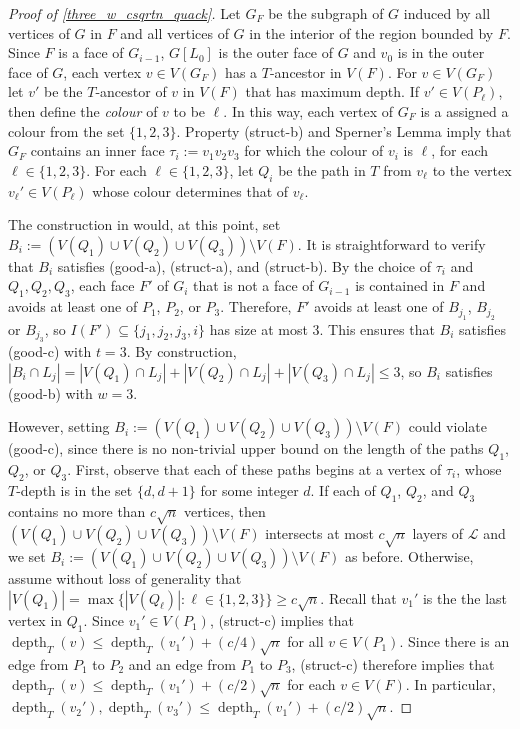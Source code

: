 \documentclass{patmorin}
\newcommand{\defin}[1]{\emph{\textcolor{brightmaroon}{#1}}}
\DeclareMathOperator{\depth}{depth}
\begin{document}
\begin{proof}[Proof of \cref{three_w_csqrtn_quack}]
  Let $G_F$ be the subgraph of $G$ induced by all vertices of $G$ in $F$ and all vertices of $G$ in the interior of the region bounded by $F$.  Since $F$ is a face of $G_{i-1}$, $G[L_0]$ is the outer face of $G$ and $v_0$ is in the outer face of $G$, each vertex $v\in V(G_F)$ has a $T$-ancestor in $V(F)$.  For $v\in V(G_F)$ let $v'$ be the $T$-ancestor of $v$ in $V(F)$ that has maximum depth.   If $v'\in V(P_\ell)$, then define the \defin{colour} of $v$ to be $\ell$.  In this way, each vertex of $G_F$ is a assigned a colour from the set $\{1,2,3\}$.  Property (struct-b) and Sperner's Lemma imply that $G_F$ contains an inner face $\tau_i:=v_1v_2v_3$ for which the colour of $v_i$ is $\ell$, for each $\ell\in\{1,2,3\}$.  For each $\ell\in\{1,2,3\}$, let $Q_i$ be the path in $T$ from $v_\ell$ to the vertex $v_{\ell}'\in V(P_{\ell})$ whose colour determines that of $v_\ell$.

  The construction in \citet{dujmovic.joret.ea:planar} would, at this point, set $B_i:=(V(Q_1)\cup V(Q_2)\cup V(Q_3))\setminus V(F)$.  It is straightforward to verify that $B_i$ satisfies (good-a), (struct-a), and (struct-b).  By the choice of $\tau_i$ and $Q_1,Q_2,Q_3$, each face $F'$ of $G_i$ that is not a face of $G_{i-1}$ is contained in $F$ and avoids at least one of $P_1$, $P_2$, or $P_3$. Therefore, $F'$ avoids at least one of $B_{j_1}$, $B_{j_2}$ or $B_{j_3}$, so $I(F')\subseteq \{j_1,j_2,j_3,i\}$ has size at most $3$. This ensures that $B_i$ satisfies (good-c) with $t=3$.  By construction, $|B_i\cap L_j|=|V(Q_1)\cap L_j| + |V(Q_2)\cap L_j| + |V(Q_3)\cap L_j| \le 3$, so $B_i$ satisfies (good-b) with $w=3$.

  However, setting $B_i:=(V(Q_1)\cup V(Q_2)\cup V(Q_3))\setminus V(F)$ could violate (good-c), since there is no non-trivial upper bound on the length of the paths $Q_1$, $Q_2$, or $Q_3$.  First, observe that each of these paths begins at a vertex of $\tau_i$, whose $T$-depth is in the set $\{d,d+1\}$ for some integer $d$. If each of $Q_1$, $Q_2$, and $Q_3$ contains no more than $c\sqrt{n}$ vertices, then $(V(Q_1)\cup V(Q_2)\cup V(Q_3))\setminus V(F)$ intersects at most $c\sqrt{n}$ layers of $\mathcal{L}$ and we set $B_i:=(V(Q_1)\cup V(Q_2)\cup V(Q_3))\setminus V(F)$ as before.  Otherwise, assume without loss of generality that $|V(Q_1)|=\max\{|V(Q_\ell)|:\ell\in\{1,2,3\}\}\ge c\sqrt{n}$.  Recall that $v_1'$ is the the last vertex in $Q_1$.  Since $v_1'\in V(P_1)$, (struct-c) implies that $\depth_T(v)\le \depth_T(v_1')+(c/4)\sqrt{n}$ for all $v\in V(P_1)$.  Since there is an edge from $P_1$ to $P_2$ and an edge from $P_1$ to $P_3$, (struct-c) therefore implies that $\depth_T(v)\le \depth_T(v_1')+(c/2)\sqrt{n}$ for each $v\in V(F)$. In particular, $\depth_T(v_2'),\depth_T(v_3')\le \depth_T(v_1')+(c/2)\sqrt{n}$.


\end{proof}
\end{document}
